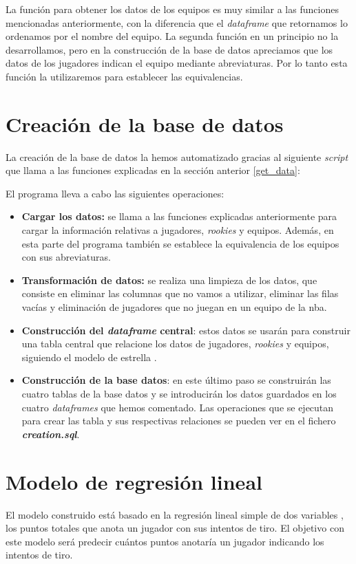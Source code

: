 \documentclass[11pt]{diazessay} %
\begin{document}
La función para obtener los datos de los equipos es muy similar a las funciones mencionadas anteriormente, con la diferencia que el \textit{dataframe} que retornamos lo ordenamos por el nombre del equipo. La segunda función en un principio no la desarrollamos, pero en la construcción de la base de datos apreciamos que los datos de los jugadores indican el equipo mediante abreviaturas. Por lo tanto esta función la utilizaremos para establecer las equivalencias.

\section*{Creación de la base de datos}
La creación de la base de datos la hemos automatizado gracias al siguiente \textit{script} que llama a las funciones explicadas en la sección anterior \ref{get_data}:


El programa lleva a cabo las siguientes operaciones:
\begin{itemize}
	\item \textbf{Cargar los datos:} se llama a las funciones explicadas anteriormente para cargar la información relativas a jugadores, \textit{rookies} y equipos.  Además, en esta parte del programa también se establece la equivalencia de los equipos con sus abreviaturas.
	\item \textbf{Transformación de datos:} se realiza una limpieza de los datos, que consiste en eliminar las columnas que no vamos a utilizar, eliminar las filas vacías y eliminación de jugadores que no juegan en un equipo de la nba.
	\item \textbf{Construcción del \textit{dataframe} central}: estos datos se usarán para construir una tabla central que relacione los datos de jugadores, \textit{rookies} y equipos, siguiendo el modelo de estrella \cite{estrella}.
	\item \textbf{Construcción de la base datos}: en este último paso se construirán las cuatro tablas de la base datos y se introducirán los datos guardados en los cuatro \textit{dataframes} que hemos comentado. Las operaciones que se ejecutan para crear las tabla y sus respectivas relaciones se pueden ver en el fichero \textit{\textbf{creation.sql}}.
\end{itemize}

\section*{Modelo de regresión lineal}
El modelo construido está basado en la regresión lineal simple de dos variables \cite{regresion}, los puntos totales que anota un jugador con sus intentos de tiro. El objetivo con este modelo será predecir cuántos puntos anotaría un jugador indicando los intentos de tiro.\\
\end{document}
